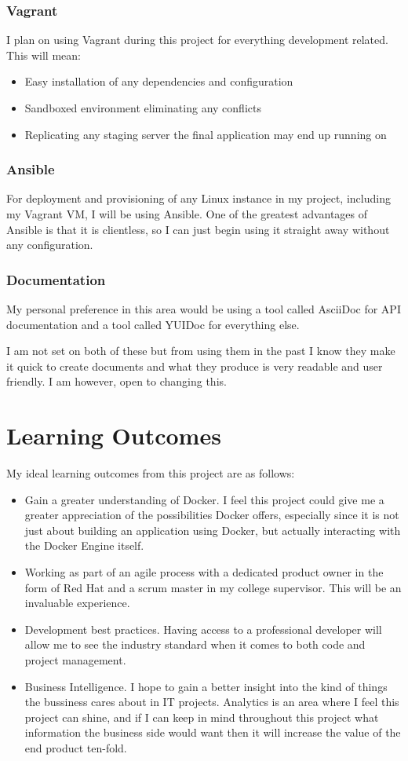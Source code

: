 \documentclass{article}
\begin{document}
	\subsubsection{Vagrant}
		I plan on using Vagrant during this project for everything development related. This will mean:
		\begin{itemize}
			\item Easy installation of any dependencies and configuration
			\item Sandboxed environment eliminating any conflicts
			\item Replicating any staging server the final application may end up running on
		\end{itemize}
	\subsubsection{Ansible}
		For deployment and provisioning of any Linux instance in my project, including my Vagrant VM, I will be using Ansible. One of the greatest advantages of Ansible is that it is clientless, so I can just begin using it straight away without any configuration.
	\subsubsection{Documentation}
		My personal preference in this area would be using a tool called AsciiDoc for API documentation and a tool called YUIDoc for everything else. 
		
		I am not set on both of these but from using them in the past I know they make it quick to create documents and what they produce is very readable and user friendly. I am however, open to changing this.

\newpage
\section{Learning Outcomes}
\label{sec:Learning Outcomes}
My ideal learning outcomes from this project are as follows:
\begin{itemize}
	\item Gain a greater understanding of Docker. I feel this project could give me a greater appreciation of the possibilities Docker offers, especially since it is not just about building an application using Docker, but actually interacting with the Docker Engine itself.
	\item Working as part of an agile process with a dedicated product owner in the form of Red Hat and a scrum master in my college supervisor. This will be an invaluable experience.
	\item Development best practices. Having access to a professional developer will allow me to see the industry standard when it comes to both code and project management. 
	\item Business Intelligence. I hope to gain a better insight into the kind of things the bussiness cares about in IT projects. Analytics is an area where I feel this project can shine, and if I can keep in mind throughout this project what information the business side would want then it will increase the value of the end product ten-fold.
\end{itemize}
\end{document}
